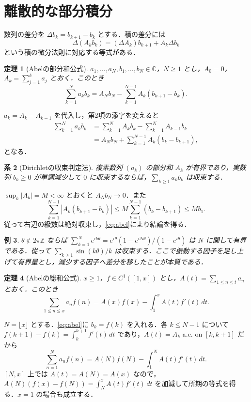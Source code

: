 \documentclass[a5paper,10pt,onecolumn]{jsarticle}
\makeatletter
\theoremstyle{mathnotetheorem}
\newtheorem{theorem}{定理}[section]
\newtheorem{corollary}[theorem]{系}
\newtheorem{example}[theorem]{例}
\renewcommand{\proofname}{証明}
\renewenvironment{proof}[1][\proofname]{%
  \par\pushQED{\qed}\normalfont\topsep4\p@\@plus2\p@\relax
  \trivlist\item[\hskip\labelsep\bfseries #1]\ignorespaces
}{\popQED\endtrivlist\@endpefalse}
\makeatother
\begin{document}
\section{離散的な部分積分}
数列の差分を $\Delta b_k=b_{k+1}-b_k$ とする．積の差分には
\[
 \Delta(A_k b_k)=(\Delta A_k)b_{k+1}+A_k\Delta b_k
\]
という積の微分法則に対応する等式がある．
\begin{theorem}[Abelの部分和公式]\label{thm:abel}
$a_1,\ldots,a_N,b_1,\ldots,b_N\in\mathbb C$，$N\ge1$ とし，$A_0=0$，$A_k=\sum_{j=1}^k a_j$ とおく．このとき
\begin{equation}\label{eq:abel}
 \sum_{k=1}^N a_k b_k=A_Nb_N-\sum_{k=1}^{N-1} A_k(b_{k+1}-b_k).
\end{equation}
\end{theorem}
\begin{proof}
$a_k=A_k-A_{k-1}$ を代入し，第2項の添字を変えると
\begin{align*}
 \sum_{k=1}^N a_k b_k&=\sum_{k=1}^N A_kb_k-\sum_{k=1}^N A_{k-1}b_k\\
 &=A_Nb_N+\sum_{k=1}^{N-1} A_k(b_k-b_{k+1}),
\end{align*}
となる．
\end{proof}
\begin{corollary}[Dirichletの収束判定法]
複素数列 $(a_k)$ の部分和 $A_k$ が有界であり，実数列 $b_k\ge0$ が単調減少して $0$ に収束するならば，$\sum_{k\ge1}a_kb_k$ は収束する．
\end{corollary}
\begin{proof}
$\sup_k|A_k|=M<\infty$ とおくと $A_Nb_N\to0$．また
\[
 \sum_{k=1}^{N-1}|A_k(b_{k+1}-b_k)|
 \le M\sum_{k=1}^{N-1}(b_k-b_{k+1})\le Mb_1.
\]
従って右辺の級数は絶対収束し，\eqref{eq:abel}により結論を得る．
\end{proof}
\begin{example}
$\theta\notin2\pi\mathbb Z$ ならば $\sum_{k=1}^Ne^{ik\theta}=e^{i\theta}(1-e^{iN\theta})/(1-e^{i\theta})$ は $N$ に関して有界である．従って $\sum_{k\ge1}\sin(k\theta)/k$ は収束する．ここで振動する因子を足し上げて有界量とし，減少する因子へ差分を移したことが本質である．
\end{example}
\begin{theorem}[Abelの総和公式]\label{thm:asum}
$x\ge1$，$f\in C^1([1,x])$ とし，$A(t)=\sum_{1\le n\le t}a_n$ とおく．このとき
\[
 \sum_{1\le n\le x}a_nf(n)
 =A(x)f(x)-\int_1^x A(t)f'(t)\,dt.
\]
\end{theorem}
\begin{proof}
$N=\lfloor x\rfloor$ とする．\eqref{eq:abel}に $b_k=f(k)$ を入れる．各 $k\le N-1$ について $f(k+1)-f(k)=\int_k^{k+1}f'(t)\,dt$ であり，$A(t)=A_k$ a.e. on $[k,k+1]$ だから
\[
 \sum_{n=1}^Na_nf(n)=A(N)f(N)-\int_1^N A(t)f'(t)\,dt.
\]
$[N,x]$ 上では $A(t)=A(N)=A(x)$ なので，$A(N)(f(x)-f(N))=\int_N^x A(t)f'(t)\,dt$ を加減して所期の等式を得る．$x=1$ の場合も成立する．
\end{proof}
\end{document}
